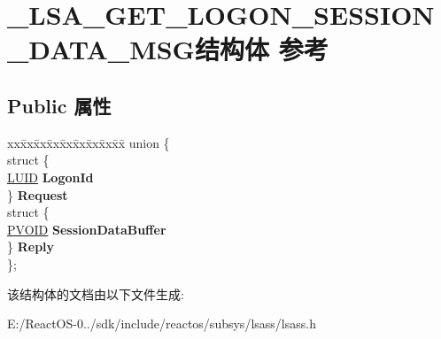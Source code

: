 \hypertarget{struct___l_s_a___g_e_t___l_o_g_o_n___s_e_s_s_i_o_n___d_a_t_a___m_s_g}{}\section{\+\_\+\+L\+S\+A\+\_\+\+G\+E\+T\+\_\+\+L\+O\+G\+O\+N\+\_\+\+S\+E\+S\+S\+I\+O\+N\+\_\+\+D\+A\+T\+A\+\_\+\+M\+S\+G结构体 参考}
\label{struct___l_s_a___g_e_t___l_o_g_o_n___s_e_s_s_i_o_n___d_a_t_a___m_s_g}
\subsection*{Public 属性}
\begin{DoxyCompactItemize}
\item 
\mbox{\label{struct___l_s_a___g_e_t___l_o_g_o_n___s_e_s_s_i_o_n___d_a_t_a___m_s_g_a1ebf1d90e565b81c22316a9383369337}} 
\begin{tabbing}
xx\=xx\=xx\=xx\=xx\=xx\=xx\=xx\=xx\=\kill
union \{\\
\>struct \{\\
\>\>\hyperlink{struct___l_u_i_d}{LUID} {\bfseries LogonId}\\
\>\} {\bfseries Request}\\
\>struct \{\\
\>\>\hyperlink{interfacevoid}{PVOID} {\bfseries SessionDataBuffer}\\
\>\} {\bfseries Reply}\\
\}; \\

\end{tabbing}\end{DoxyCompactItemize}


该结构体的文档由以下文件生成\+:\begin{DoxyCompactItemize}
\item 
E\+:/\+React\+O\+S-\/0../sdk/include/reactos/subsys/lsass/lsass.\+h\end{DoxyCompactItemize}

